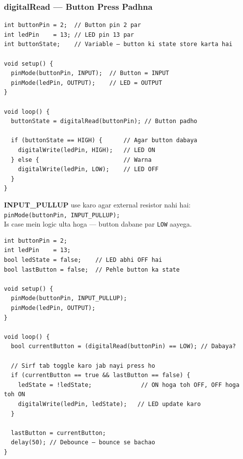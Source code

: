\documentclass[12pt,a4paper]{article}
\begin{document}
\subsubsection{digitalRead — Button Press Padhna}

\begin{tcolorbox}[codebox=Example 3: Button se LED On/Off]
\begin{lstlisting}
int buttonPin = 2;  // Button pin 2 par
int ledPin    = 13; // LED pin 13 par
int buttonState;    // Variable — button ki state store karta hai

void setup() {
  pinMode(buttonPin, INPUT);  // Button = INPUT
  pinMode(ledPin, OUTPUT);    // LED = OUTPUT
}

void loop() {
  buttonState = digitalRead(buttonPin); // Button padhо

  if (buttonState == HIGH) {      // Agar button dabaya
    digitalWrite(ledPin, HIGH);   // LED ON
  } else {                        // Warna
    digitalWrite(ledPin, LOW);    // LED OFF
  }
}
\end{lstlisting}
\end{tcolorbox}

\begin{tcolorbox}[tipbox]
\textbf{INPUT\_PULLUP} use karo agar external resistor nahi hai:\\
\texttt{pinMode(buttonPin, INPUT\_PULLUP);}\\
Is case mein logic ulta hoga — button dabane par \texttt{LOW} aayega.
\end{tcolorbox}

\begin{tcolorbox}[codebox=Example 4: Toggle Button (Press karo ON — Phir Press karo OFF)]
\begin{lstlisting}
int buttonPin = 2;
int ledPin    = 13;
bool ledState = false;    // LED abhi OFF hai
bool lastButton = false;  // Pehle button ka state

void setup() {
  pinMode(buttonPin, INPUT_PULLUP);
  pinMode(ledPin, OUTPUT);
}

void loop() {
  bool currentButton = (digitalRead(buttonPin) == LOW); // Dabaya?

  // Sirf tab toggle karo jab nayi press ho
  if (currentButton == true && lastButton == false) {
    ledState = !ledState;              // ON hoga toh OFF, OFF hoga toh ON
    digitalWrite(ledPin, ledState);   // LED update karo
  }

  lastButton = currentButton;
  delay(50); // Debounce — bounce se bachao
}
\end{lstlisting}
\end{tcolorbox}
\end{document}
